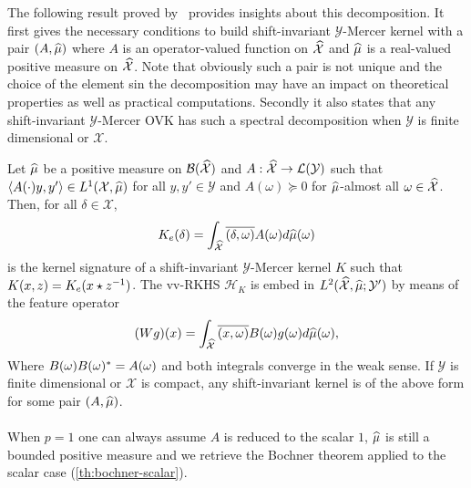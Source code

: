 \documentclass[twoside,11pt]{article}
\begin{document}
The following result proved
by~\citet{Carmeli2010} provides insights about this decomposition. It first gives the necessary conditions to build
shift-invariant $\mathcal{Y}$-Mercer kernel with a pair $(A, \widehat{\mu})$ where
$A$ is an operator-valued function on $\widehat{\mathcal{X}}$ and $\widehat{\mu}$ is
a real-valued positive measure on $\widehat{\mathcal{X}}$. Note that obviously
such a pair is not unique and the choice of the element sin the decomposition may have an impact on
theoretical properties as well as practical computations.  Secondly it also
states that any shift-invariant $\mathcal{Y}$-Mercer \acs{OVK} has such a spectral decomposition when $\mathcal{Y}$
is finite dimensional or $\mathcal{X}$.
\begin{proposition}
    \label{pr:mercer_kernel_bochner}
    Let $\widehat{\mu}$ be a positive measure on
    $\mathcal{B}(\mathcal{\widehat{\mathcal{X}}})$ and $A: \widehat{\mathcal{X}}\to
    \mathcal{L}(\mathcal{Y})$ such that $\langle A(\cdot)y,y'\rangle\in
    L^1(\mathcal{X},\widehat{\mu})$ for all $y,y'\in\mathcal{Y}$ and
    $A(\omega)\succcurlyeq 0$ for $\widehat{\mu}$-almost all
    $\omega\in\widehat{\mathcal{X}}$. Then, for all $\delta \in \mathcal{X}$,
    \begin{dmath}
        \label{eq:AK0}
        K_e(\delta)=\int_{\dual{\mathcal{X}}} \conj{\pairing{\delta, \omega}}
        A(\omega) d\dual{\mu}(\omega)
    \end{dmath}
    is the kernel signature of a shift-invariant $\mathcal{Y}$-Mercer kernel
    $K$ such that $K(x,z)=K_e(x \star {z}^{-1})$. The \acs{vv-RKHS}
    $\mathcal{H}_K$ is embed in
    $L^2(\widehat{\mathcal{X}},\widehat{\mu};\mathcal{Y}')$ by means of the feature
    operator
    \begin{dmath}
        \label{eq:feature_operator}
        (Wg)(x)=\int_{\mathcal{\dual{X}}} \conj{\pairing{x,\omega}} B(\omega)
        g(\omega) d\dual{\mu}(\omega),
    \end{dmath}
    Where $B(\omega)B(\omega)^*=A(\omega)$ and both integrals converge
    in the weak sense. If $\mathcal{Y}$ is finite dimensional or $\mathcal{X}$
    is compact, any shift-invariant kernel is of the above form for some pair
    $(A, \widehat{\mu})$.
\end{proposition}
\paragraph{}
When $p=1$ one can always assume $A$ is reduced to the scalar $1$, $\widehat{\mu}$
is still a bounded positive measure and we retrieve the Bochner theorem applied
to the scalar case (\cref{th:bochner-scalar}).
\end{document}
